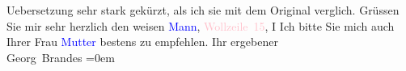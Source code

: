                     Uebersetzung sehr stark gekürzt, als ich sie mit dem Original verglich. Grüssen
                    Sie mir sehr herzlich den weisen \textcolor{blue}{Mann}{},
                        \textcolor{pink}{Wollzeile 15}{}\ledrightnote{\textcolor{pink}{Wollzeile}}, I\pend
           \pstart
           Ich bitte Sie mich auch Ihrer Frau \textcolor{blue}{Mutter}{}
                    bestens zu empfehlen.\pend
           \pstart
           Ihr ergebener{\\[\baselineskip]}\spacefill\mbox{Georg Brandes}\pend
           \leftskip=0em{}\endnumbering{}  
      